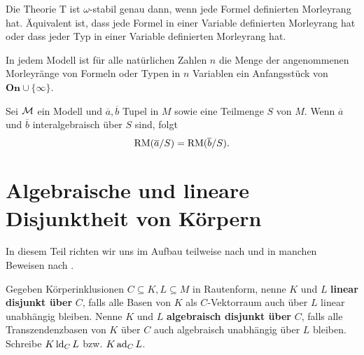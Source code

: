 	\begin{fact}
		Die Theorie T ist $\omega$-stabil genau dann, wenn jede Formel definierten Morleyrang hat. Äquivalent ist, dass jede Formel in einer Variable definierten Morleyrang hat oder dass jeder Typ in einer Variable definierten Morleyrang hat.
	\end{fact}
	
	\begin{fact}\label{Anfangsstück}
		In jedem Modell ist für alle natürlichen Zahlen $n$ die Menge der angenommenen Morleyränge von Formeln oder Typen in $n$ Variablen ein Anfangsstück von $\textbf{On}\cup\{\infty\}$.
	\end{fact}
	
	\begin{fact}
		Sei $\mathcal{M}$ ein Modell und $\overline{a},\overline{b}$ Tupel in $M$ sowie eine Teilmenge $S$ von $M$. Wenn $\overline{a}$ und $\overline{b}$ interalgebraisch über $S$ sind, folgt $$\operatorname{RM}(\overline{a}/S)=\operatorname{RM}(\overline{b}/S).$$
	\end{fact}
	
	\section{Algebraische und lineare Disjunktheit von Körpern}
	In diesem Teil richten wir uns im Aufbau teilweise nach \cite{Delon} und in manchen Beweisen nach \cite{SergeLang}.
	
    \begin{definition}
    	Gegeben Körperinklusionen $C\subseteq K,L\subseteq M$ in Rautenform, nenne $K$ und $L$ \textbf{linear disjunkt über} $C$, falls alle Basen von $K$ als $C$-Vektorraum auch über $L$ linear unabhängig bleiben. Nenne $K$ und $L$ \textbf{algebraisch disjunkt über} $C$, falls alle Transzendenzbasen von $K$ über $C$ auch algebraisch unabhängig über $L$ bleiben. Schreibe $K\operatorname{ld}_CL$ bzw. $K\operatorname{ad}_CL$.
    \end{definition}
    
